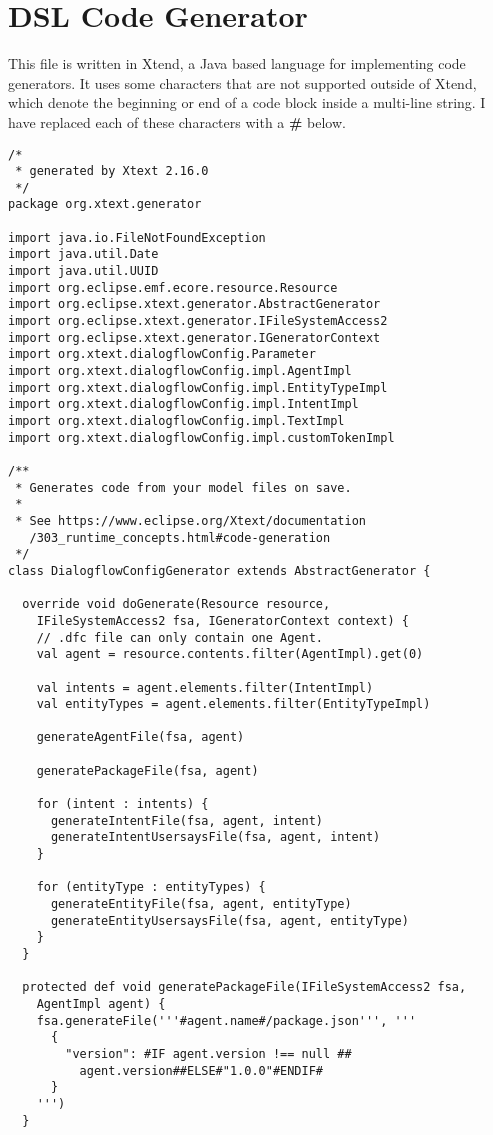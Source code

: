 \chapter{DSL Code Generator}

This file is written in Xtend, a Java based language for implementing code generators. It uses some characters that are not supported outside of Xtend, which denote the beginning or end of a code block inside a multi-line string. I have replaced each of these characters with a \textbf{\#} below.

\begin{lstlisting}
/*
 * generated by Xtext 2.16.0
 */
package org.xtext.generator

import java.io.FileNotFoundException
import java.util.Date
import java.util.UUID
import org.eclipse.emf.ecore.resource.Resource
import org.eclipse.xtext.generator.AbstractGenerator
import org.eclipse.xtext.generator.IFileSystemAccess2
import org.eclipse.xtext.generator.IGeneratorContext
import org.xtext.dialogflowConfig.Parameter
import org.xtext.dialogflowConfig.impl.AgentImpl
import org.xtext.dialogflowConfig.impl.EntityTypeImpl
import org.xtext.dialogflowConfig.impl.IntentImpl
import org.xtext.dialogflowConfig.impl.TextImpl
import org.xtext.dialogflowConfig.impl.customTokenImpl

/**
 * Generates code from your model files on save.
 * 
 * See https://www.eclipse.org/Xtext/documentation
   /303_runtime_concepts.html#code-generation
 */
class DialogflowConfigGenerator extends AbstractGenerator {

  override void doGenerate(Resource resource, 
    IFileSystemAccess2 fsa, IGeneratorContext context) {
    // .dfc file can only contain one Agent.
    val agent = resource.contents.filter(AgentImpl).get(0)

    val intents = agent.elements.filter(IntentImpl)
    val entityTypes = agent.elements.filter(EntityTypeImpl)

    generateAgentFile(fsa, agent)

    generatePackageFile(fsa, agent)

    for (intent : intents) {
      generateIntentFile(fsa, agent, intent)
      generateIntentUsersaysFile(fsa, agent, intent)
    }

    for (entityType : entityTypes) {
      generateEntityFile(fsa, agent, entityType)
      generateEntityUsersaysFile(fsa, agent, entityType)
    }
  }

  protected def void generatePackageFile(IFileSystemAccess2 fsa, 
    AgentImpl agent) {
    fsa.generateFile('''#agent.name#/package.json''', '''
      {
        "version": #IF agent.version !== null ##
          agent.version##ELSE#"1.0.0"#ENDIF#
      }
    ''')
  }


\end{lstlisting}
